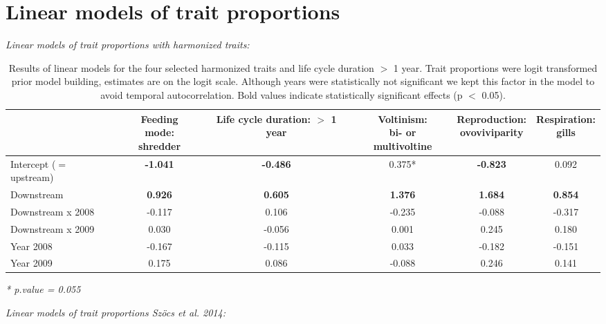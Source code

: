 \documentclass[../Draft_harmonization_paper.tex]{subfiles}
\begin{document}
\section*{Linear models of trait proportions}
\textit{Linear models of trait proportions with harmonized traits:}
\begin{table}[ht]
    \centering
    \caption{Results of linear models for the four selected harmonized traits and life cycle duration $>$ 1 year. Trait proportions were logit transformed prior model building, estimates are on the logit scale. Although years were statistically not significant we kept this factor in the model to avoid temporal autocorrelation. Bold values indicate statistically significant effects (p $<$ 0.05).}
    \begin{tabular}{lccccc}
    \hline
    & \specialcell{Feeding mode:\\ shredder} & \specialcell{Life cycle duration:\\ $>$ 1 year} & \specialcell{Voltinism:\\ bi- or multivoltine} & \specialcell{Reproduction:\\ ovoviviparity} & \specialcell{Respiration:\\ gills} \\ 
    \hline
    Intercept ($=$ upstream) & \textbf{-1.041} & \textbf{-0.486} & 0.375* & \textbf{-0.823} & 0.092\\ 
    Downstream & \textbf{0.926} & \textbf{0.605} & \textbf{1.376} & \textbf{1.684} & \textbf{0.854}\\ 
    Downstream x 2008 & -0.117 & 0.106 & -0.235 & -0.088 & -0.317\\ 
    Downstream x 2009 & 0.030 & -0.056 & 0.001 & 0.245 & 0.180\\ 
    Year 2008 & -0.167 & -0.115 & 0.033 & -0.182 & -0.151\\ 
    Year 2009 & 0.175 & 0.086 & -0.088 & 0.246 & 0.141\\ 
    \hline
    \end{tabular}
    \textit{* p.value = 0.055}
\end{table}
\newline
\newline
\newline
\textit{Linear models of trait proportions Szöcs et al. 2014:}
\end{document}

